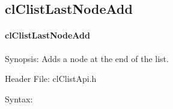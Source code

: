 \begin{flushleft}
\subsection{clClistLastNodeAdd}
\hypertarget{pagecl103}{}\paragraph{cl\-Clist\-Last\-Node\-Add}\label{pagecl103}
\begin{Desc}
\item[Synopsis:]Adds a node at the end of the list.\end{Desc}
\begin{Desc}
\item[Header File:]clClistApi.h\end{Desc}
\begin{Desc}
\item[Syntax:]


\end{Desc}
\end{flushleft}
